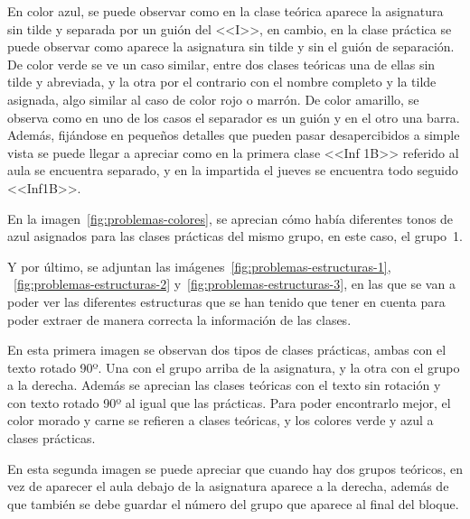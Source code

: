En color azul, se puede observar como en la clase teórica aparece la asignatura sin tilde y separada por un guión del <<I>>, en cambio, en la clase práctica se puede observar como aparece la asignatura sin tilde y sin el guión de separación.
De color verde se ve un caso similar, entre dos clases teóricas una de ellas sin tilde y abreviada, y la otra por el contrario con el nombre completo y la tilde asignada, algo similar al caso de color rojo o marrón.
De color amarillo, se observa como en uno de los casos el separador es un guión y en el otro una barra. Además, fijándose en pequeños detalles que pueden pasar desapercibidos a simple vista se puede llegar a apreciar como en la primera clase <<Inf 1B>> referido al aula se encuentra separado, y en la impartida el jueves se encuentra todo seguido <<Inf1B>>.

En la imagen~\ref{fig:problemas-colores}, se aprecian cómo había diferentes tonos de azul asignados para las clases prácticas del mismo grupo, en este caso, el grupo~1.



Y por último, se adjuntan las imágenes~\ref{fig:problemas-estructuras-1}, ~\ref{fig:problemas-estructuras-2} y~\ref{fig:problemas-estructuras-3}, en las que se van a poder ver las diferentes estructuras que se han tenido que tener en cuenta para poder extraer de manera correcta la información de las clases.


En esta primera imagen se observan dos tipos de clases prácticas, ambas con el texto rotado 90º. Una con el grupo arriba de la asignatura, y la otra con el grupo a la derecha. Además se aprecian las clases teóricas con el texto sin rotación y con texto rotado 90º al igual que las prácticas. Para poder encontrarlo mejor, el color morado y carne se refieren a clases teóricas, y los colores verde y azul a clases prácticas.


En esta segunda imagen se puede apreciar que cuando hay dos grupos teóricos, en vez de aparecer el aula debajo de la asignatura aparece a la derecha, además de que también se debe guardar el número del grupo que aparece al final del bloque.

